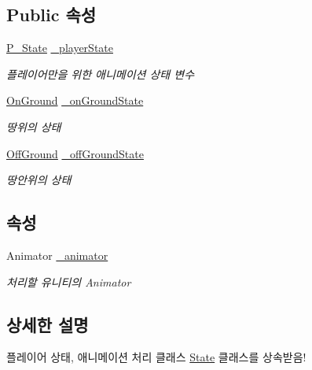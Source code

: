 \subsection*{Public 속성}
\begin{DoxyCompactItemize}
\item 
\mbox{\hyperlink{class_player_state_afe68f1a1529955d173ccd309da55001b}{P\+\_\+\+State}} \mbox{\hyperlink{class_player_state_a9492a14c13c0dc523c37cb44d334ab68}{\+\_\+player\+State}}
\begin{DoxyCompactList}\small\item\em 플레이어만을 위한 애니메이션 상태 변수 \end{DoxyCompactList}\item 
\mbox{\hyperlink{class_state_ab9eb1c1d81f1903b8486d1275e78b68e}{On\+Ground}} \mbox{\hyperlink{class_state_ab3170df5e58f541f39edff3c1278d443}{\+\_\+on\+Ground\+State}}
\begin{DoxyCompactList}\small\item\em 땅위의 상태 \end{DoxyCompactList}\item 
\mbox{\hyperlink{class_state_a7d945e793324c017a973205564cf1a56}{Off\+Ground}} \mbox{\hyperlink{class_state_ad421039bfc35b46969f174c9617ab786}{\+\_\+off\+Ground\+State}}
\begin{DoxyCompactList}\small\item\em 땅안위의 상태 \end{DoxyCompactList}\end{DoxyCompactItemize}
\subsection*{속성}
\begin{DoxyCompactItemize}
\item 
Animator \mbox{\hyperlink{class_state_aff1dd03a1b3c63053b23371d6d70cd1a}{\+\_\+animator}}
\begin{DoxyCompactList}\small\item\em 처리할 유니티의 Animator \end{DoxyCompactList}\end{DoxyCompactItemize}


\subsection{상세한 설명}
플레이어 상태, 애니메이션 처리 클래스 \mbox{\hyperlink{class_state}{State}} 클래스를 상속받음! 

